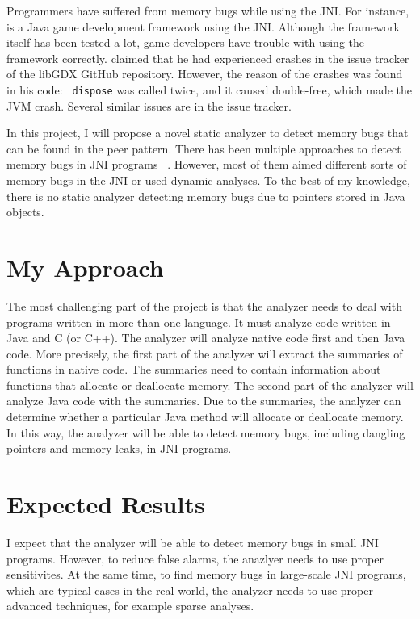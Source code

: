 \documentclass[acmsmall,screen]{acmart}
\begin{document}
Programmers have suffered from memory bugs while using the JNI. For instance,
\citet{libgdx} is a Java game development framework using the JNI. Although the
framework itself has been tested a lot, game developers have trouble with using
the framework correctly. \citet{libgdxissue} claimed that he had experienced
crashes in the issue tracker of the libGDX GitHub
repository. However, the reason of the crashes was found in his code: {\tt
dispose} was called twice, and it caused double-free, which made the JVM crash.
Several similar issues are in the issue tracker.

In this project, I will propose a novel static analyzer to detect memory bugs
that can be found in the peer pattern.
There has been multiple approaches to detect memory bugs in JNI programs
~\cite{tan2006safe,kondoh2008finding,lee2010jinn,hong2017museum}. However, most
of them aimed different sorts of memory bugs in the JNI or used dynamic
analyses. To the best of my knowledge, there is no static analyzer
detecting memory bugs due to pointers stored in Java objects.

\section{My Approach}

The most challenging part of the project is that the analyzer needs to deal
with programs written in more than one language. It must analyze code written in
Java and C (or C++). The analyzer will analyze native code first and then Java
code. More precisely, the first part of the analyzer will extract the summaries of
functions in native code. The summaries need to contain information about functions
that allocate or deallocate memory. The second part of the
analyzer will analyze Java code with the summaries. Due to the summaries, the
analyzer can determine whether a particular Java method will allocate or
deallocate memory. In this way, the analyzer will be able to detect memory bugs,
including dangling pointers and memory leaks, in JNI programs.

\section{Expected Results}

I expect that the analyzer will be able to detect memory bugs in small JNI programs.
However, to reduce false alarms, the anazlyer needs to use proper sensitivites.
At the same time, to find memory bugs in large-scale JNI programs,
which are typical cases in the real world, the analyzer needs to use proper
advanced techniques, for example sparse analyses.


\end{document}
